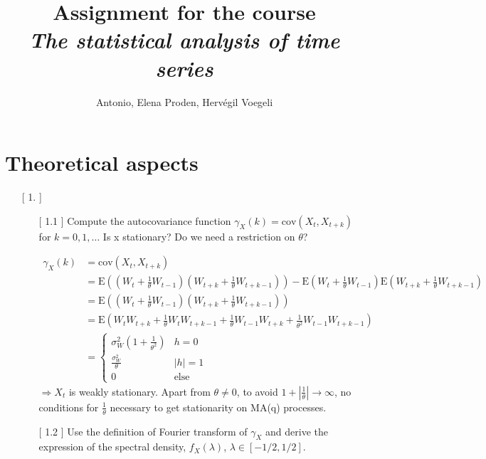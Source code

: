 \documentclass[10pt,a4paper]{article}
\author{ Antonio, Elena Proden, Hervégil Voegeli}
\title{Assignment for the course \\ \textit{The statistical analysis of time series}}
\begin{document}
	\maketitle
	\newpage
	\section{Theoretical aspects}
	\begin{enumerate}
	\item[[ 1.]] \begin{enumerate}
			\item[[ 1.1]] Compute the autocovariance function $\gamma_{X} (k) = \text{cov}(X_t,X_{t+k})$ for $k=0,1,\dots$ Is { \selectfont \large  x } stationary? Do we need a restriction on $\theta$?
			
			\begin{align*}
				\gamma_{X}(k) &= \text{cov}(X_t,X_{t+k}) \\
				&= \text{E}((W_t+\frac{1}{\theta} W_{t-1})(W_{t+k}+\frac{1}{\theta}W_{t+k-1})) - \text{E}(W_t+\frac{1}{\theta} W_{t-1})\text{E}(W_{t+k}+\frac{1}{\theta}W_{t+k-1}) \\
				&= \text{E}((W_t+\frac{1}{\theta} W_{t-1})(W_{t+k}+\frac{1}{\theta}W_{t+k-1})) \\
				&= \text{E}(W_tW_{t+k} + \frac{1}{\theta} W_tW_{t+k-1}+\frac{1}{\theta} W_{t-1}W_{t+k} + \frac{1}{\theta^2} W_{t-1}W_{t+k-1}) \\
				&= 	\left\{
							\begin{array}{ll}
								\sigma^2_{W} (1+\frac{1}{\theta^2}) & h=0\\
								\frac{\sigma^2_{W}}{\theta} & |h|=1\\
								0 & \text{else}
							\end{array}
					\right.			
			\end{align*}		
			$\Rightarrow X_{t}$ is weakly stationary.\newline
			Apart from $\theta \neq 0$, to avoid $1+|\frac{1}{\theta}|  \rightarrow \infty$, no conditions for $\frac{1}{\theta}$ necessary to get stationarity on MA(q) processes.
			
			
			
			\item[[ 1.2]] Use the definition of Fourier transform of $\gamma_X$ and derive the expression of the spectral density, $f_X(\lambda)$, $\lambda \in \left[-1/2,1/2\right]$.
			

\end{enumerate}
\end{enumerate}
\end{document}
